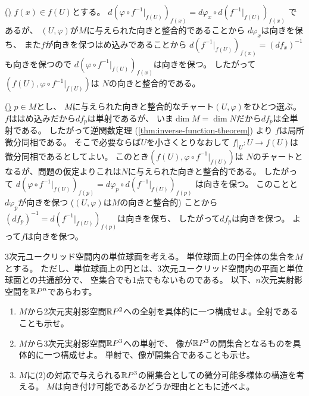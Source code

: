 \documentclass[report]{jlreq}
\begin{document}
\begin{answer}
    \uline{(\Rightarrow)} \quad
    $f(x) \in f(U)$とする。
    $d(\varphi \circ f^{-1}|_{f(U)})_{f(x)}
        = d\varphi_x \circ d(f^{-1}|_{f(U)})_{f(x)}$
    であるが、
    $(U, \varphi)$が$M$に与えられた向きと整合的であることから
    $d\varphi_x$は向きを保ち、
    また$f$が向きを保つはめ込みであることから
    $d(f^{-1}|_{f(U)})_{f(x)} = (df_x)^{-1}$も向きを保つので
    $d(\varphi \circ f^{-1}|_{f(U)})_{f(x)}$は向きを保つ。
    したがって$(f(U), \varphi \circ f^{-1}|_{f(U)})$は
    $N$の向きと整合的である。

    \uline{(\Leftarrow)} \quad
    $p \in M$とし、
    $M$に与えられた向きと整合的なチャート$(U, \varphi)$をひとつ選ぶ。
    $f$ははめ込みだから$df_p$は単射であるが、
    いま$\dim M = \dim N$だから$df_p$は全単射である。
    したがって逆関数定理 (\cref{thm:inverse-function-theorem}) より
    $f$は局所微分同相である。
    そこで必要ならば$U$を小さくとりなおして
    $f|_U \colon U \to f(U)$は微分同相であるとしてよい。
    このとき$(f(U), \varphi \circ f^{-1}|_{f(U)})$は
    $N$のチャートとなるが、問題の仮定よりこれは$N$に与えられた向きと整合的である。
    したがって
    $d(\varphi \circ f^{-1}|_{f(U)})_{f(p)}
        = d\varphi_p \circ d(f^{-1}|_{f(U)})_{f(p)}$
    は向きを保つ。
    このことと$d\varphi_p$が向きを保つ
    (\because $(U, \varphi)$は$M$の向きと整合的)
    ことから$(df_p)^{-1} = d(f^{-1}|_{f(U)})_{f(p)}$は向きを保ち、
    したがって$df_p$は向きを保つ。
    よって$f$は向きを保つ。
\end{answer}

\begin{problem}[東大数理 2006B]
    3次元ユークリッド空間内の単位球面を考える。
    単位球面上の円全体の集合を$M$とする。
    ただし、単位球面上の円とは、3次元ユークリッド空間内の平面と単位球面との共通部分で、
    空集合でも1点でもないものである。
    以下、$n$次元実射影空間を$\mathbb{R} P^n$であらわす。
    \begin{enumerate}
        \item $M$から2次元実射影空間$\mathbb{R} P^2$への全射を具体的に一つ構成せよ。全射であることも示せ。
        \item $M$から3次元実射影空間$\mathbb{R} P^3$への単射で、
            像が$\mathbb{R} P^3$の開集合となるものを具体的に一つ構成せよ。
            単射で、像が開集合であることも示せ。
        \item $M$に(2)の対応で与えられる$\mathbb{R} P^3$の開集合としての微分可能多様体の構造を考える。
            $M$は向き付け可能であるかどうか理由とともに述べよ。 
    \end{enumerate}
\end{problem}
\end{document}
